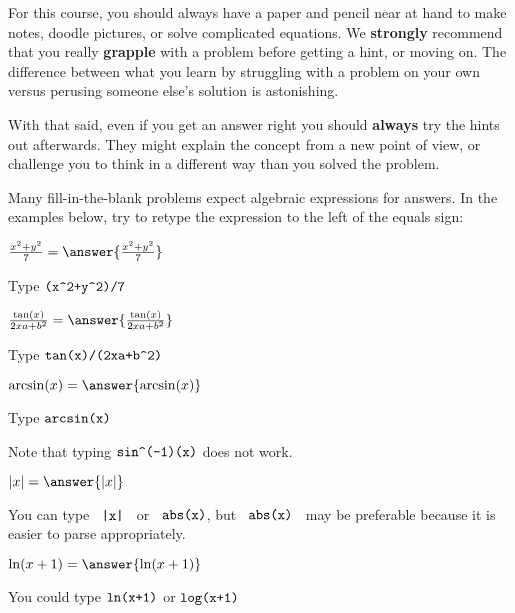 \documentclass{ximera}
\begin{document}
For this course, you should always have a paper and pencil near at
hand to make notes, doodle pictures, or solve complicated equations.
We \textbf{strongly} recommend that you really \textbf{grapple} with a
problem before getting a hint, or moving on.  The difference between
what you learn by struggling with a problem on your own versus
perusing someone else's solution is astonishing.

With that said, even if you get an answer right you should
\textbf{always} try the hints out afterwards.  They might explain the
concept from a new point of view, or challenge you to think in a
different way than you solved the problem.


Many fill-in-the-blank problems expect algebraic expressions for answers.  In the examples below, try to retype the expression to the left of the equals sign: 

\begin{example}
  $\frac{x^2+y^2}{7} = \answer{\frac{x^2+y^2}{7}}$
  \begin{feedback}
    Type $\verb|(x^2+y^2)/7|$
  \end{feedback}
\end{example}

\begin{example}
  $\frac{\tan(x)}{2xa+b^2} = \answer{\frac{\tan(x)}{2xa+b^2} }$
  \begin{feedback}
    Type $\verb|tan(x)/(2xa+b^2)|$
  \end{feedback}
\end{example}

\begin{example}
  $\arcsin(x) = \answer{\arcsin(x)}$
  \begin{feedback}
    Type $\verb|arcsin(x)|$

    Note that typing $\verb|sin^(-1)(x)|$ does not work.
  \end{feedback}
\end{example}

\begin{example}
  $|x| = \answer{|x|}$
  \begin{feedback}
    You can type $\verb! |x| !$ or $\verb! abs(x)!$, but
    $\verb! abs(x) !$ may be preferable because it is easier to parse
    appropriately.
  \end{feedback}
\end{example}
\begin{example}
  $\ln(x+1)= \answer{\ln(x+1)}$
  \begin{feedback}
    You could type $\verb|ln(x+1)|$ or $\verb|log(x+1)|$
  \end{feedback}
\end{example}
\end{document}
